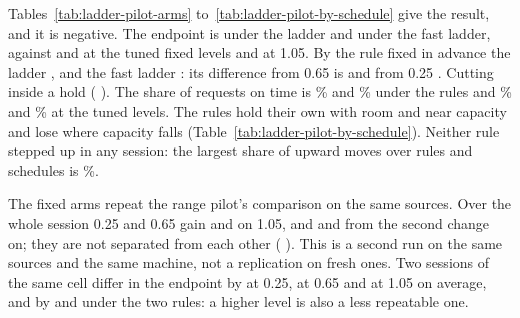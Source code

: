 Tables~\ref{tab:ladder-pilot-arms} to~\ref{tab:ladder-pilot-by-schedule} give the result, and it is negative. The endpoint is \LadderPilotUtilityLadder{} under the ladder and \LadderPilotUtilityFast{} under the fast ladder, against \LadderPilotUtilityQuarter{} and \LadderPilotUtilityLow{} at the tuned fixed levels and \LadderPilotUtilityTop{} at 1.05. By the rule fixed in advance the ladder \LadderPilotReadingLadder, and the fast ladder \LadderPilotReadingFast: its difference from 0.65 is \LadderPilotUtilityDiffFastLow{} \LadderPilotUtilityDiffFastLowT{} and from 0.25 \LadderPilotUtilityDiffFastQuarter{} \LadderPilotUtilityDiffFastQuarterT. Cutting inside a hold \LadderPilotFastCut{} (\LadderPilotUtilityDiffFastLadder{} \LadderPilotUtilityDiffFastLadderT). The share of requests on time is \LadderPilotOnTimeLadder\% and \LadderPilotOnTimeFast\% under the rules and \LadderPilotOnTimeQuarter\% and \LadderPilotOnTimeLow\% at the tuned levels. The rules hold their own with room and near capacity and lose where capacity falls (Table~\ref{tab:ladder-pilot-by-schedule}). Neither rule stepped up in any session: the largest share of upward moves over rules and schedules is \LadderPilotUpShare\%.

The fixed arms repeat the range pilot's comparison on the same sources. Over the whole session 0.25 and 0.65 gain \LadderPilotUtilityDiffQuarterTop{} \LadderPilotUtilityDiffQuarterTopT{} and \LadderPilotUtilityDiffLowTop{} \LadderPilotUtilityDiffLowTopT{} on 1.05, and \LadderPilotLaterUtilityDiffQuarterTop{} and \LadderPilotLaterUtilityDiffLowTop{} from the second change on; they are not separated from each other (\LadderPilotUtilityDiffQuarterLow{} \LadderPilotUtilityDiffQuarterLowT). This is a second run on the same sources and the same machine, not a replication on fresh ones. Two sessions of the same cell differ in the endpoint by \LadderPilotRepeatQuarter{} at 0.25, \LadderPilotRepeatLow{} at 0.65 and \LadderPilotRepeatTop{} at 1.05 on average, and by \LadderPilotRepeatFast{} and \LadderPilotRepeatLadder{} under the two rules: a higher level is also a less repeatable one.

\begin{table}[t]
\centering\small
\resizebox{\linewidth}{!}{}
\caption{Controller development pilot; added after the report was read. Means over sources in stretches of 3~s from a session's first acknowledgement. In collapse-recovery the capacity is 1.2~Mbit/s, 0.35~Mbit/s from 6~s and 1.2~Mbit/s from 12~s.}
\label{tab:ladder-pilot-timeline}
\end{table}

